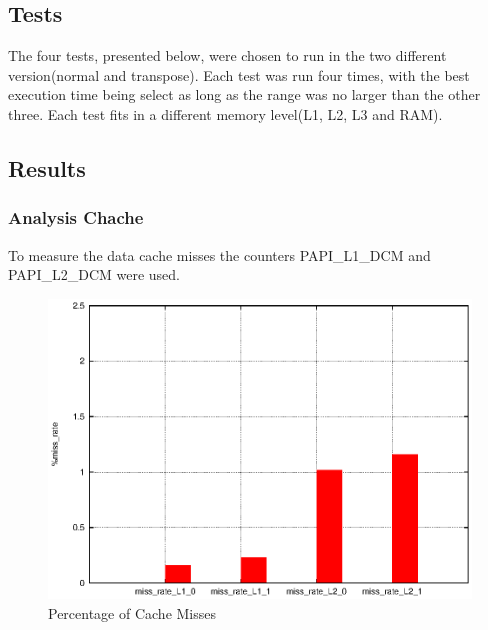 \documentclass[a4paper,10pt,openright,openbib]{article}
\begin{document}
\subsection{Tests}
The four tests, presented below, were chosen to run in the two different version(normal and transpose). Each test was run four times, with the best execution time being select as long as the range was no larger than the other three. Each test fits in a different memory level(L1, L2, L3 and RAM).   
\begin{table}[!htp]
\end{table}
\subsection{Results}
\subsubsection{Analysis Chache}

 To measure the data cache misses the counters PAPI\_L1\_DCM and PAPI\_L2\_DCM were used.

\begin{figure}[!htp]
	\centering
	\begin{minipage}[t]{0.5\linewidth}
		\includegraphics[width=\textwidth]{images/caches.eps}
		\caption{Percentage of Cache Misses \label{fig:cachel1}}
	\end{minipage}
\end{figure}
\end{document}
